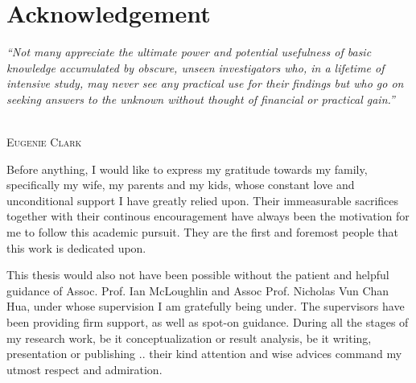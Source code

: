 


\section*{Acknowledgement} %
\pagestyle{empty} %

\epigraph{\textit{``Not many appreciate the ultimate power and potential usefulness of basic knowledge accumulated by obscure, unseen investigators who, in a lifetime of intensive study, may never see any practical use for their findings but who go on seeking answers to the unknown without thought of financial or practical gain.''}}%
{\textit{}\\ \textsc{Eugenie Clark}}

\onehalfspacing

Before anything, I would like to express my gratitude towards my family, specifically my wife, my parents and my kids,
  whose constant love and unconditional support I have greatly relied upon. 
Their immeasurable sacrifices together with their continous encouragement have always been the motivation for me to follow this academic pursuit.
They are the first and foremost people that this work is dedicated upon.

This thesis would also not have been possible without the patient and helpful guidance of Assoc. Prof. Ian McLoughlin and Assoc Prof. Nicholas Vun Chan Hua, 
	under whose supervision I am gratefully being under. 
The supervisors have been providing firm support, as well as spot-on guidance. 
During all the stages of my research work, 
	be it conceptualization or result analysis, be it writing, presentation or publishing ..
	their kind attention and wise advices command my utmost respect and admiration.


